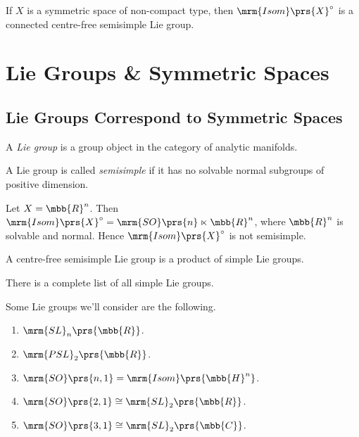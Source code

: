 \documentclass[10pt, twoside]{book}
\begin{document}
\begin{theorem}
If $X$ is a symmetric space of non-compact type, then $\mrm{Isom}\prs{X}^\circ$ is a connected centre-free semisimple Lie group.
\end{theorem}

\section{Lie Groups \& Symmetric Spaces}

\subsection{Lie Groups Correspond to Symmetric Spaces}

\begin{definition}
A \emph{Lie group} is a group object in the category of analytic manifolds.
\end{definition}

\begin{definition}
A Lie group is called \emph{semisimple} if it has no solvable normal subgroups of positive dimension.
\end{definition}

\begin{example}
Let $X = \mbb{R}^n$. Then $\mrm{Isom}\prs{X}^\circ = \mrm{SO}\prs{n} \ltimes \mbb{R}^n$, where $\mbb{R}^n$ is solvable and normal. Hence $\mrm{Isom}\prs{X}^\circ$ is not semisimple.
\end{example}

\begin{proposition}
A centre-free semisimple Lie group is a product of simple Lie groups.
\end{proposition}

\begin{fact}
There is a complete list of all simple Lie groups.
\end{fact}

Some Lie groups we'll consider are the following.

\begin{examples*}
\enumthm
\begin{enumerate}
\item $\mrm{SL}_n\prs{\mbb{R}}$.
\item $\mrm{PSL}_2\prs{\mbb{R}}$.
\item $\mrm{SO}\prs{n,1} = \mrm{Isom}\prs{\mbb{H}^n}$.
\item $\mrm{SO}\prs{2,1} \cong \mrm{SL}_2\prs{\mbb{R}}$.
\item $\mrm{SO}\prs{3,1} \cong \mrm{SL}_2\prs{\mbb{C}}$.
\end{enumerate}
\end{examples*}
\end{document}
